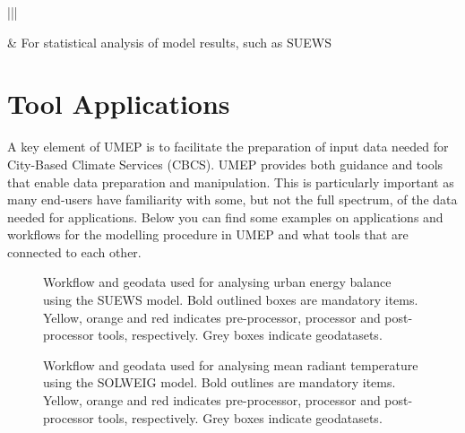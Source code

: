 \documentclass[letterpaper,10pt,english]{sphinxmanual}
\begin{document}


\begin{savenotes}\sphinxattablestart
\centering
\begin{tabular}[t]{|||}
\hline

{\hyperref[\detokenize{post_processor/Benchmark System:benchmark}]{}}
&
For statistical analysis of model results, such as SUEWS
\\
\hline
\end{tabular}
\par
\sphinxattableend\end{savenotes}


\section{Tool Applications}
\label{\detokenize{Introduction:tool-applications}}\label{\detokenize{Introduction:toolapplications}}
A key element of UMEP is to facilitate the preparation of input data
needed for City-Based Climate Services (CBCS). UMEP provides both
guidance and tools that enable data preparation and manipulation. This
is particularly important as many end-users have familiarity with some,
but not the full spectrum, of the data needed for applications. Below
you can find some examples on applications and workflows for the
modelling procedure in UMEP and what tools that are connected to each
other.

\begin{figure}[htbp]
\centering
\capstart

\noindent{}
\caption{Workflow and geodata used for analysing urban energy balance
using the SUEWS model. Bold outlined boxes are mandatory items.
Yellow, orange and red indicates pre-processor, processor and
post-processor tools, respectively. Grey boxes indicate geodatasets.}\label{\detokenize{Introduction:id4}}\end{figure}

\begin{figure}[htbp]
\centering
\capstart

\noindent{}
\caption{Workflow and geodata used for analysing mean radiant
temperature using the SOLWEIG model. Bold outlines are mandatory
items. Yellow, orange and red indicates pre-processor, processor and
post-processor tools, respectively. Grey boxes indicate geodatasets.}\label{\detokenize{Introduction:id5}}\end{figure}
\end{document}

